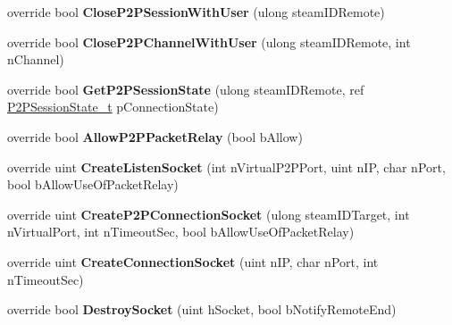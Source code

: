 \begin{DoxyCompactItemize}
override bool {\bfseries Close\+P2\+P\+Session\+With\+User} (ulong steam\+I\+D\+Remote)
\item 
\mbox{\label{class_valve_1_1_steamworks_1_1_c_steam_networking_a0cf22b7a3e71aa7b9e0a68c071be8a14}} 
override bool {\bfseries Close\+P2\+P\+Channel\+With\+User} (ulong steam\+I\+D\+Remote, int n\+Channel)
\item 
\mbox{\label{class_valve_1_1_steamworks_1_1_c_steam_networking_a265b226db0ccd7d3ab62bda795a2f4d9}} 
override bool {\bfseries Get\+P2\+P\+Session\+State} (ulong steam\+I\+D\+Remote, ref \hyperlink{struct_valve_1_1_steamworks_1_1_p2_p_session_state__t}{P2\+P\+Session\+State\+\_\+t} p\+Connection\+State)
\item 
\mbox{\label{class_valve_1_1_steamworks_1_1_c_steam_networking_acc217637dba4c199af46de15e7ca4e9f}} 
override bool {\bfseries Allow\+P2\+P\+Packet\+Relay} (bool b\+Allow)
\item 
\mbox{\label{class_valve_1_1_steamworks_1_1_c_steam_networking_a5aa197cdad3e4da5245aa2ae3eea4a4f}} 
override uint {\bfseries Create\+Listen\+Socket} (int n\+Virtual\+P2\+P\+Port, uint n\+IP, char n\+Port, bool b\+Allow\+Use\+Of\+Packet\+Relay)
\item 
\mbox{\label{class_valve_1_1_steamworks_1_1_c_steam_networking_a0830d176f2bec2d738134ab7f6d81837}} 
override uint {\bfseries Create\+P2\+P\+Connection\+Socket} (ulong steam\+I\+D\+Target, int n\+Virtual\+Port, int n\+Timeout\+Sec, bool b\+Allow\+Use\+Of\+Packet\+Relay)
\item 
\mbox{\label{class_valve_1_1_steamworks_1_1_c_steam_networking_adab573d0528ac303902c1cb053ed4c31}} 
override uint {\bfseries Create\+Connection\+Socket} (uint n\+IP, char n\+Port, int n\+Timeout\+Sec)
\item 
\mbox{\label{class_valve_1_1_steamworks_1_1_c_steam_networking_a5e010664164cc1cffad7dd61476092de}} 
override bool {\bfseries Destroy\+Socket} (uint h\+Socket, bool b\+Notify\+Remote\+End)

\end{DoxyCompactItemize}
